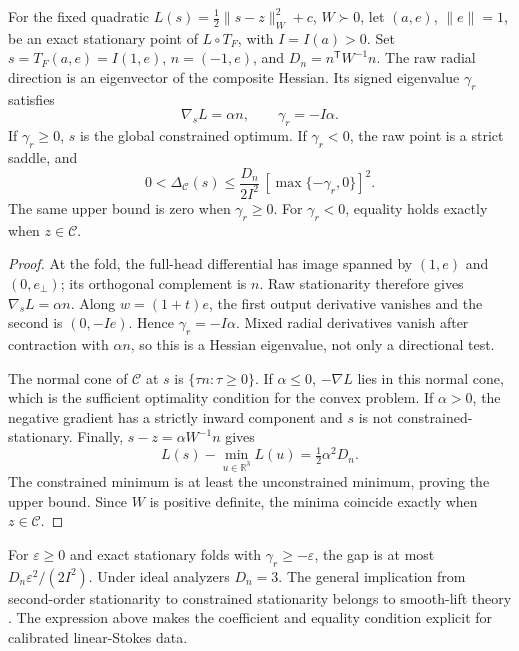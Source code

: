 \begin{theorem}
\label{SI-thm:certificate}
For the fixed quadratic $L(s)=\tfrac12\|s-z\|_W^2+c$, $W\succ0$, let $(a,e)$, $\|e\|=1$, be an exact stationary point of $L\circ T_F$, with $I=I(a)>0$. Set $s=T_F(a,e)=I(1,e)$, $n=(-1,e)$, and $D_n=n^{\mathsf T}W^{-1}n$. The raw radial direction is an eigenvector of the composite Hessian. Its signed eigenvalue $\gamma_r$ satisfies
\begin{equation}
 \nabla_s L=\alpha n,\qquad \gamma_r=-I\alpha.
 \label{SI-eq:normalcurvature}
\end{equation}
If $\gamma_r\geq0$, $s$ is the global constrained optimum. If $\gamma_r<0$, the raw point is a strict saddle, and
\begin{equation}
 0<\Delta_{\mathcal C}(s)\leq
 \frac{D_n}{2I^2}\,[\max\{-\gamma_r,0\}]^2.
 \label{SI-eq:curvaturecertificate}
\end{equation}
The same upper bound is zero when $\gamma_r\geq0$. For $\gamma_r<0$, equality holds exactly when $z\in\mathcal C$.
\end{theorem}
\begin{proof}
At the fold, the full-head differential has image spanned by $(1,e)$ and $(0,e_\perp)$; its orthogonal complement is $n$. Raw stationarity therefore gives $\nabla_sL=\alpha n$. Along $w=(1+t)e$, the first output derivative vanishes and the second is $(0,-Ie)$. Hence $\gamma_r=-I\alpha$. Mixed radial derivatives vanish after contraction with $\alpha n$, so this is a Hessian eigenvalue, not only a directional test.

The normal cone of $\mathcal C$ at $s$ is $\{\tau n:\tau\geq0\}$. If $\alpha\leq0$, $-\nabla L$ lies in this normal cone, which is the sufficient optimality condition for the convex problem. If $\alpha>0$, the negative gradient has a strictly inward component and $s$ is not constrained-stationary. Finally, $s-z=\alpha W^{-1}n$ gives
\begin{equation*}
 L(s)-\min_{u\in\mathbb R^3}L(u)=\tfrac12\alpha^2D_n.
\end{equation*}
The constrained minimum is at least the unconstrained minimum, proving the upper bound. Since $W$ is positive definite, the minima coincide exactly when $z\in\mathcal C$.
\end{proof}
For $\varepsilon\geq0$ and exact stationary folds with $\gamma_r\geq-\varepsilon$, the gap is at most $D_n\varepsilon^2/(2I^2)$. Under ideal analyzers $D_n=3$. The general implication from second-order stationarity to constrained stationarity belongs to smooth-lift theory \cite{supp-lifts}. The expression above makes the coefficient and equality condition explicit for calibrated linear-Stokes data.


